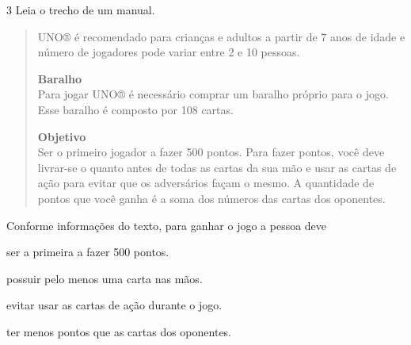 \num{3} Leia o trecho de um manual.

\begin{quote}
UNO® é recomendado para crianças e adultos a partir de 7 anos de idade e número de jogadores pode variar entre 2 e 10 pessoas.

\textbf{Baralho}\\
Para jogar UNO® é necessário comprar um baralho próprio para o jogo. Esse baralho é composto por 108 cartas.

\textbf{Objetivo}\\
Ser o primeiro jogador a fazer 500 pontos. Para fazer pontos, você deve
livrar-se o quanto antes de todas as cartas da sua mão e usar as cartas 
de ação para evitar que os adversários façam o mesmo. A quantidade de 
pontos que você ganha é a soma dos números das cartas dos oponentes.
\end{quote}


Conforme informações do texto, para ganhar o jogo a pessoa deve

\begin{escolha}
\item ser a primeira a fazer 500 pontos.

\item possuir pelo menos uma carta nas mãos.

\item evitar usar as cartas de ação durante o jogo.

\item ter menos pontos que as cartas dos oponentes.
\end{escolha}

